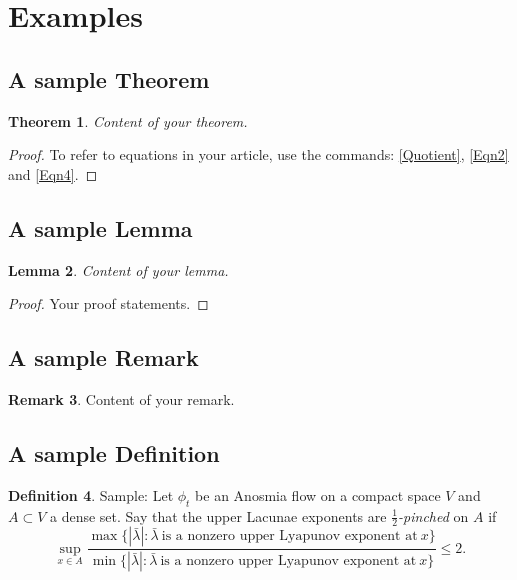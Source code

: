 \documentclass{aims} %
\newtheorem{theorem}{Theorem}[section]
\newtheorem{lemma}[theorem]{Lemma}
\theoremstyle{definition}
\newtheorem{definition}[theorem]{Definition}
\newtheorem{remark}[theorem]{Remark}
\begin{document}
\section{Examples}

\subsection{A sample Theorem}

\begin{theorem} \label{result1}
Content of your theorem.
\end{theorem}

\begin{proof}
To refer to equations in your article, use the commands:
\eqref{Quotient}, \eqref{Eqn2} and \eqref{Eqn4}.
\end{proof}

\subsection{A sample Lemma}

\begin{lemma} \label{L: Lyapunov exponents}
Content of your lemma.
\end{lemma}

\begin{proof}
Your proof statements.
\end{proof}

\subsection{A sample Remark}

\begin{remark}
Content of your remark.
\end{remark}

\subsection{A sample Definition}

\begin{definition} Sample: Let $\phi_{t}$ be an Anosmia flow on a
        compact space $V$ and $A \subset V$ a dense set. Say
        that the upper Lacunae exponents are
        \emph{$\frac{1}{2}$-pinched} on $A$ if
  \begin{equation}\label{Quotient}
        \sup_{x \in A} \frac{\max \{ |\bar{\lambda}|: \bar{\lambda} \
        \text{is a nonzero upper Lyapunov exponent at} \ x \}}
        {\min \{ |\bar{\lambda}|: \bar{\lambda} \ \text{is a
        nonzero upper Lyapunov exponent at} \ x\}}
         \leq 2.
  \end{equation}
\end{definition}
\end{document}
